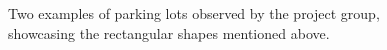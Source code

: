 \begin{figure}[H]
  \centering
  \begin{subfigure}[b]{0.55\textwidth}
  \end{subfigure}
  \quad
  \begin{subfigure}[b]{0.395\textwidth}
  \end{subfigure}
  \caption{Two examples of parking lots observed by the project group, showcasing the rectangular shapes mentioned above.}
  \label{fig:parkings}
\end{figure}


